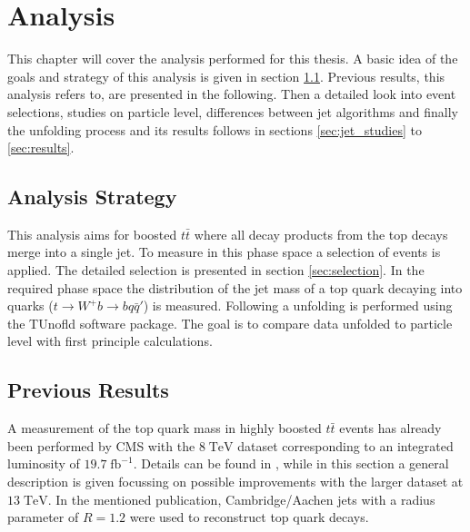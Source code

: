 \chapter{Analysis}
\label{ch:Ana}
	This chapter will cover the analysis performed for this thesis. A basic idea of the goals and strategy of this analysis is given in section \ref{sec:strategy}. Previous results, this analysis refers to, are presented in the following. Then a detailed look into event selections, studies on particle level, differences between jet algorithms and finally the unfolding process and its results follows in sections \ref{sec:jet_studies} to \ref{sec:results}.
\section{Analysis Strategy}
\label{sec:strategy}
	This analysis aims for boosted $t\bar{t}$ where all decay products from the top decays merge into a single jet. To measure in this phase space a selection of events is applied. The detailed selection is presented in section \ref{sec:selection}. In the required phase space the distribution of the jet mass of a top quark decaying into quarks ($t\rightarrow W^{+} b \rightarrow b q \bar{q}'$) is measured. Following a unfolding is performed using the TUnofld \cite{tunfold} software package. The goal is to compare data unfolded to particle level with first principle calculations.
\section{Previous Results}
	A measurement of the top quark mass in highly boosted $t\bar{t}$ events has already been performed by CMS with the $8\;\text{TeV}$ dataset corresponding to an integrated luminosity of $19.7\;\text{fb}^{-1}$. Details can be found in \cite{torben_paper}, while in this section a general description is given focussing on possible improvements with the larger dataset at $13\;\text{TeV}$. In the mentioned publication, Cambridge/Aachen jets with a radius parameter of $R=1.2$ were used to reconstruct top quark decays.

